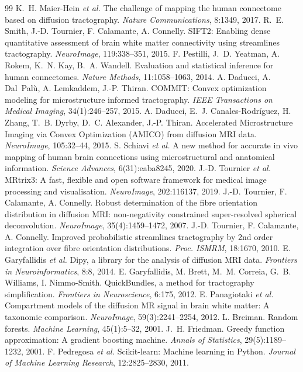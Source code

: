 \documentclass[11pt,a4paper]{article}
\begin{document}
\begin{thebibliography}{99}
\small
{} K.~H. Maier-Hein \textit{et al.} The challenge of mapping the human
  connectome based on diffusion tractography. \textit{Nature Communications}, 8:1349, 2017.
 R.~E. Smith, J.-D. Tournier, F. Calamante, A. Connelly. SIFT2: Enabling
  dense quantitative assessment of brain white matter connectivity using streamlines
  tractography. \textit{NeuroImage}, 119:338--351, 2015.
 F. Pestilli, J.~D. Yeatman, A. Rokem, K.~N. Kay, B.~A. Wandell.
  Evaluation and statistical inference for human connectomes. \textit{Nature Methods},
  11:1058--1063, 2014.
 A. Daducci, A. Dal~Pal\`u, A. Lemkaddem, J.-P. Thiran. COMMIT: Convex
  optimization modeling for microstructure informed tractography. \textit{IEEE Transactions
  on Medical Imaging}, 34(1):246--257, 2015.
 A. Daducci, E.~J. Canales-Rodr\'iguez, H. Zhang, T.~B. Dyrby,
  D.~C. Alexander, J.-P. Thiran. Accelerated Microstructure Imaging via Convex Optimization
  (AMICO) from diffusion MRI data. \textit{NeuroImage}, 105:32--44, 2015.
 S. Schiavi \textit{et al.} A new method for accurate in vivo mapping
  of human brain connections using microstructural and anatomical information.
  \textit{Science Advances}, 6(31):eaba8245, 2020.
 J.-D. Tournier \textit{et al.} MRtrix3: A fast, flexible and open
  software framework for medical image processing and visualisation. \textit{NeuroImage},
  202:116137, 2019.
 J.-D. Tournier, F. Calamante, A. Connelly. Robust determination of the
  fibre orientation distribution in diffusion MRI: non-negativity constrained super-resolved
  spherical deconvolution. \textit{NeuroImage}, 35(4):1459--1472, 2007.
 J.-D. Tournier, F. Calamante, A. Connelly. Improved probabilistic
  streamlines tractography by 2nd order integration over fibre orientation distributions.
  \textit{Proc. ISMRM}, 18:1670, 2010.
 E. Garyfallidis \textit{et al.} Dipy, a library for the analysis of
  diffusion MRI data. \textit{Frontiers in Neuroinformatics}, 8:8, 2014.
 E. Garyfallidis, M. Brett, M.~M. Correia, G.~B. Williams,
  I. Nimmo-Smith. QuickBundles, a method for tractography simplification. \textit{Frontiers
  in Neuroscience}, 6:175, 2012.
 E. Panagiotaki \textit{et al.} Compartment models of the diffusion
  MR signal in brain white matter: A taxonomic comparison. \textit{NeuroImage},
  59(3):2241--2254, 2012.
 L. Breiman. Random forests. \textit{Machine Learning}, 45(1):5--32, 2001.
 J.~H. Friedman. Greedy function approximation: A gradient boosting
  machine. \textit{Annals of Statistics}, 29(5):1189--1232, 2001.
 F. Pedregosa \textit{et al.} Scikit-learn: Machine learning in
  Python. \textit{Journal of Machine Learning Research}, 12:2825--2830, 2011.
\end{thebibliography}
\end{document}
